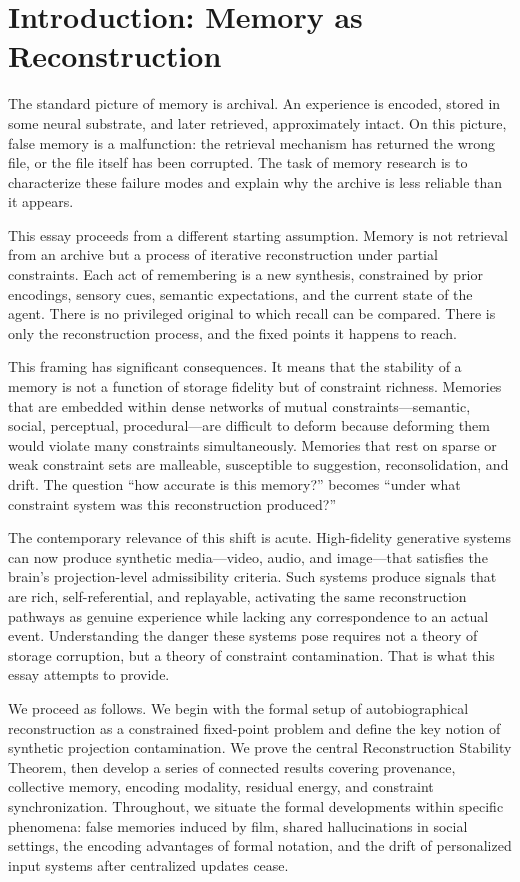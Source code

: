 \documentclass[12pt, letterpaper]{article}
\theoremstyle{flyxion}
\begin{document}
\newpage

\section*{Introduction: Memory as Reconstruction}

The standard picture of memory is archival. An experience is encoded, stored in some neural substrate, and later retrieved, approximately intact. On this picture, false memory is a malfunction: the retrieval mechanism has returned the wrong file, or the file itself has been corrupted. The task of memory research is to characterize these failure modes and explain why the archive is less reliable than it appears.

This essay proceeds from a different starting assumption. Memory is not retrieval from an archive but a process of iterative reconstruction under partial constraints. Each act of remembering is a new synthesis, constrained by prior encodings, sensory cues, semantic expectations, and the current state of the agent. There is no privileged original to which recall can be compared. There is only the reconstruction process, and the fixed points it happens to reach.

This framing has significant consequences. It means that the stability of a memory is not a function of storage fidelity but of constraint richness. Memories that are embedded within dense networks of mutual constraints—semantic, social, perceptual, procedural—are difficult to deform because deforming them would violate many constraints simultaneously. Memories that rest on sparse or weak constraint sets are malleable, susceptible to suggestion, reconsolidation, and drift. The question ``how accurate is this memory?'' becomes ``under what constraint system was this reconstruction produced?''

The contemporary relevance of this shift is acute. High-fidelity generative systems can now produce synthetic media—video, audio, and image—that satisfies the brain's projection-level admissibility criteria. Such systems produce signals that are rich, self-referential, and replayable, activating the same reconstruction pathways as genuine experience while lacking any correspondence to an actual event. Understanding the danger these systems pose requires not a theory of storage corruption, but a theory of constraint contamination. That is what this essay attempts to provide.

We proceed as follows. We begin with the formal setup of autobiographical reconstruction as a constrained fixed-point problem and define the key notion of synthetic projection contamination. We prove the central Reconstruction Stability Theorem, then develop a series of connected results covering provenance, collective memory, encoding modality, residual energy, and constraint synchronization. Throughout, we situate the formal developments within specific phenomena: false memories induced by film, shared hallucinations in social settings, the encoding advantages of formal notation, and the drift of personalized input systems after centralized updates cease.
\end{document}

